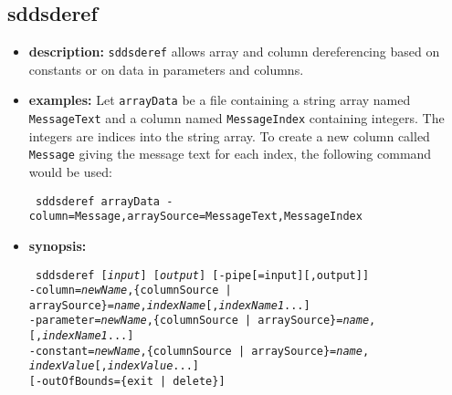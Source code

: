 \newpage 
 
\subsection{sddsderef} 
\label{sddsderef} 
 
\begin{itemize} 
\item {\bf description:} 
\verb|sddsderef| allows array and column dereferencing based on constants 
or on data in parameters and columns. 
 
\item {\bf examples:}  
Let \verb|arrayData| be a file containing a string array named  
\verb|MessageText| 
and a column named \verb|MessageIndex| containing integers. 
The integers are indices into the string array.  To create a new column 
called \verb|Message| giving the message text for each index, the 
following command would be used: 
\begin{flushleft}{\tt  
sddsderef arrayData -column=Message,arraySource=MessageText,MessageIndex 
} 
\end{flushleft} 
\item {\bf synopsis:}  
\begin{flushleft}{\tt 
sddsderef [{\em input}] [{\em output}] [-pipe[=input][,output]] 
\\ -column={\em newName},\{columnSource | arraySource\}={\em name},{\em indexName}[,{\em indexName1}...] 
\\ -parameter={\em newName},\{columnSource | arraySource\}={\em name},
\hspace*{10mm}{\em indexName}[,{\em indexName1}...] 
\\ -constant={\em newName},\{columnSource | arraySource\}={\em name},
\hspace*{10mm} {\em indexValue}[,{\em indexValue}...] 
\\ \hspace*{0.1mm} [-outOfBounds=\{exit | delete\}]
}\end{flushleft} 
 

\end{itemize}
